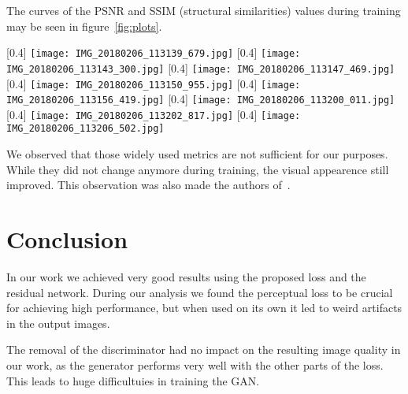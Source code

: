 \documentclass[10pt,twocolumn,letterpaper]{article}
\begin{document}
The curves of the PSNR and SSIM (structural similarities) values
during training may be seen in figure~\ref{fig:plots}.
\begin{figure*}[h]
  \centering
  \captionsetup{}
  \subcaptionbox{}[0.4\linewidth]{%
    \texttt{[image: IMG\_20180206\_113139\_679.jpg]}
  }
  \subcaptionbox{}[0.4\linewidth]{%
    \texttt{[image: IMG\_20180206\_113143\_300.jpg]}
  }
  \subcaptionbox{}[0.4\linewidth]{%
    \texttt{[image: IMG\_20180206\_113147\_469.jpg]}
  }
  \subcaptionbox{}[0.4\linewidth]{%
    \texttt{[image: IMG\_20180206\_113150\_955.jpg]}
  }
  \subcaptionbox{}[0.4\linewidth]{%
    \texttt{[image: IMG\_20180206\_113156\_419.jpg]}
  }
  \subcaptionbox{}[0.4\linewidth]{%
    \texttt{[image: IMG\_20180206\_113200\_011.jpg]}
  }
  \subcaptionbox{}[0.4\linewidth]{%
    \texttt{[image: IMG\_20180206\_113202\_817.jpg]}
  }
  \subcaptionbox{}[0.4\linewidth]{%
    \texttt{[image: IMG\_20180206\_113206\_502.jpg]}
  }  
  \caption{Curves of metrics during training}
  \label{fig:plots}
\end{figure*}


We observed that those widely used metrics are not sufficient for our
purposes.  While they did not change anymore during training,
the visual appearence still improved.  This observation was also made
the authors of~\cite{LedigChristian2016PSIS}.

\section{Conclusion}
\label{sec:conclusion}
In our work we achieved very good results using the proposed loss and
the residual network. During our analysis we found the perceptual loss
to be crucial for achieving high performance, but when used on its own
it led to weird artifacts in the output images.

The removal of the discriminator had no impact on the resulting image
quality in our work, as the generator performs very well with the
other parts of the loss. This leads to huge difficultuies in training
the GAN.



\appendix

{
  \nocite{*}                      %
  \small
  
  
  
}
\end{document}
